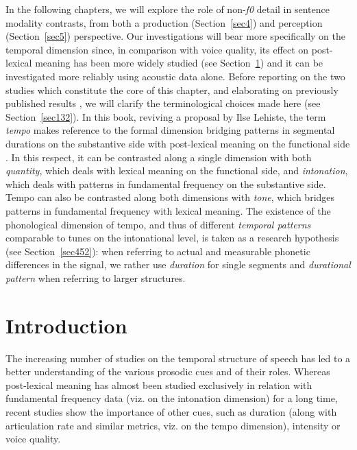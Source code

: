 In the following chapters, we will explore the role of non-\textit{f0} detail in sentence modality contrasts, from both a production (Section~\ref{sec4}) and perception (Section~\ref{sec5}) perspective. Our investigations will bear more specifically on the temporal dimension since, in comparison with voice quality, its effect on post-lexical meaning has been more widely studied (see Section~\ref{sec41}) and it can be investigated more reliably using acoustic data alone. Before reporting on the two studies which constitute the core of this chapter, and elaborating on previously published results \citep{cangemi2011local,cangemi2011prosodia,cangemiFORTHbeyond}, we will clarify the terminological choices made here (see Section~\ref{sec132}). In this book, reviving a proposal by Ilse Lehiste, the term \textit{tempo} makes reference to the formal dimension bridging patterns in segmental durations on the substantive side with post-lexical meaning on the functional side \citep{lehiste1970suprasegmentals}. In this respect, it can be contrasted along a single dimension with both \textit{quantity}, which deals with lexical meaning on the functional side, and \textit{intonation}, which deals with patterns in fundamental frequency on the substantive side. Tempo can also be contrasted along both dimensions with \textit{tone}, which bridges patterns in fundamental frequency with lexical meaning. The existence of the phonological dimension of tempo, and thus of different \textit{temporal patterns} comparable to tunes on the intonational level, is taken as a research hypothesis (see Section~\ref{sec452}): when referring to actual and measurable phonetic differences in the signal, we rather use \textit{duration} for single segments and \textit{durational pattern} when referring to larger structures.

\section{Introduction}\label{sec41}
The increasing number of studies on the temporal structure of speech has led to a better understanding of the various prosodic cues and of their roles. Whereas post-lexical meaning has almost been studied exclusively in relation with fundamental frequency data (viz. on the intonation dimension) for a long time, recent studies show the importance of other cues, such as duration (along with articulation rate and similar metrics, viz. on the tempo dimension), intensity or voice quality. 


